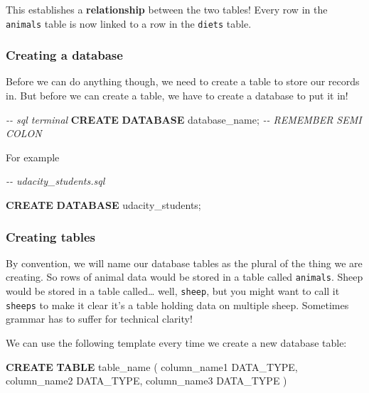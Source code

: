 \documentclass[11pt]{article}
\newenvironment{Shaded}{}{}
\newcommand{\KeywordTok}[1]{\textcolor[rgb]{0.00,0.44,0.13}{\textbf{{#1}}}}
\newcommand{\CommentTok}[1]{\textcolor[rgb]{0.38,0.63,0.69}{\textit{{#1}}}}
\newcommand{\NormalTok}[1]{{#1}}
\begin{document}
This establishes a \textbf{relationship} between the two tables! Every
row in the \texttt{animals} table is now linked to a row in the
\texttt{diets} table.

    \hypertarget{creating-a-database}{%
\subsubsection{Creating a database}\label{creating-a-database}}

Before we can do anything though, we need to create a table to store our
records in. But before we can create a table, we have to create a
database to put it in!

\begin{Shaded}
\begin{Highlighting}[]
\CommentTok{{-}{-} sql terminal}
\KeywordTok{CREATE} \KeywordTok{DATABASE}\NormalTok{ database\_name; }\CommentTok{{-}{-} REMEMBER SEMI COLON}
\end{Highlighting}
\end{Shaded}

For example

\begin{Shaded}
\begin{Highlighting}[]
\CommentTok{{-}{-} udacity\_students.sql}

\KeywordTok{CREATE} \KeywordTok{DATABASE}\NormalTok{ udacity\_students;}
\end{Highlighting}
\end{Shaded}

    \hypertarget{creating-tables}{%
\subsubsection{Creating tables}\label{creating-tables}}

By convention, we will name our database tables as the plural of the
thing we are creating. So rows of animal data would be stored in a table
called \texttt{animals}. Sheep would be stored in a table called\ldots{}
well, \texttt{sheep}, but you might want to call it \texttt{sheeps} to
make it clear it's a table holding data on multiple sheep. Sometimes
grammar has to suffer for technical clarity!

We can use the following template every time we create a new database
table:

\begin{Shaded}
\begin{Highlighting}[]

\KeywordTok{CREATE} \KeywordTok{TABLE}\NormalTok{ table\_name (}
\NormalTok{  column\_name1 DATA\_TYPE,}
\NormalTok{  column\_name2 DATA\_TYPE,}
\NormalTok{  column\_name3 DATA\_TYPE}
\NormalTok{)}
\end{Highlighting}
\end{Shaded}
\end{document}
